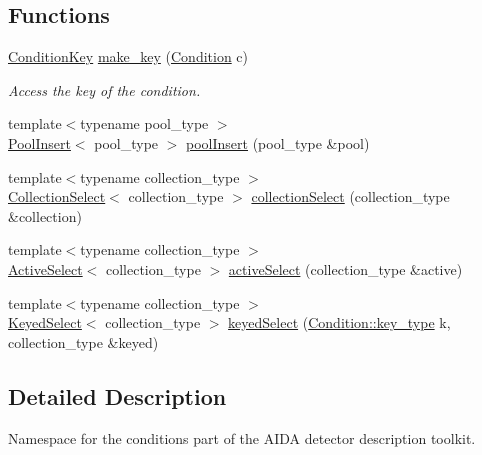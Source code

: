 \subsection*{Functions}
\begin{DoxyCompactItemize}
\item 
\hyperlink{class_d_d4hep_1_1_conditions_1_1_condition_key}{Condition\+Key} \hyperlink{namespace_d_d4hep_1_1_conditions_a5d280367b77508df52c5caadc9d84abf}{make\+\_\+key} (\hyperlink{class_d_d4hep_1_1_conditions_1_1_condition}{Condition} c)
\begin{DoxyCompactList}\small\item\em Access the key of the condition. \end{DoxyCompactList}\item 
{\footnotesize template$<$typename pool\+\_\+type $>$ }\\\hyperlink{class_d_d4hep_1_1_conditions_1_1_pool_insert}{Pool\+Insert}$<$ pool\+\_\+type $>$ \hyperlink{namespace_d_d4hep_1_1_conditions_a9e28e73c1c0d3e7b66a6e47a4e49c216}{pool\+Insert} (pool\+\_\+type \&pool)
\item 
{\footnotesize template$<$typename collection\+\_\+type $>$ }\\\hyperlink{class_d_d4hep_1_1_conditions_1_1_collection_select}{Collection\+Select}$<$ collection\+\_\+type $>$ \hyperlink{namespace_d_d4hep_1_1_conditions_a4b40993dfb50f69634e7deea27dca6ff}{collection\+Select} (collection\+\_\+type \&collection)
\item 
{\footnotesize template$<$typename collection\+\_\+type $>$ }\\\hyperlink{class_d_d4hep_1_1_conditions_1_1_active_select}{Active\+Select}$<$ collection\+\_\+type $>$ \hyperlink{namespace_d_d4hep_1_1_conditions_a99e5326b64f1b9135d4c34e32fb3bb4b}{active\+Select} (collection\+\_\+type \&active)
\item 
{\footnotesize template$<$typename collection\+\_\+type $>$ }\\\hyperlink{class_d_d4hep_1_1_conditions_1_1_keyed_select}{Keyed\+Select}$<$ collection\+\_\+type $>$ \hyperlink{namespace_d_d4hep_1_1_conditions_a4e9ef8a0bc2b4949f98d1a40814f9fd3}{keyed\+Select} (\hyperlink{class_d_d4hep_1_1_conditions_1_1_condition_a7528efa762e8cc072ef80ea67c3531f9}{Condition\+::key\+\_\+type} k, collection\+\_\+type \&keyed)
\end{DoxyCompactItemize}


\subsection{Detailed Description}
Namespace for the conditions part of the A\+I\+DA detector description toolkit. 

